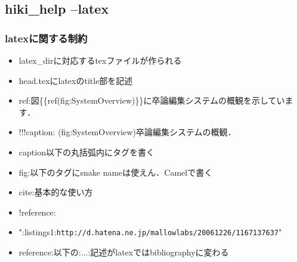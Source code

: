 \subsection{hiki\_help --latex}
\subsubsection{latexに関する制約}
\begin{itemize}
\item latex\_dirに対応するtexファイルが作られる
\item head.texにlatexのtitle部を記述
\item ref:図\{\{ref(fig:SystemOverview)\}\}に卒論編集システムの概観を示しています．
\item !!!caption: (fig:SystemOverview)卒論編集システムの概観．
\item caption以下の丸括弧内にタグを書く
\item fig:以下のタグにsnake nameは使えん．Camelで書く
\item cite:基本的な使い方\cite{listings1}
\item !reference:
\item ":listings1:\verb|http://d.hatena.ne.jp/mallowlabs/20061226/1167137637|"
\item reference:以下の:...:記述がlatexではbibliographyに変わる
\end{itemize}
